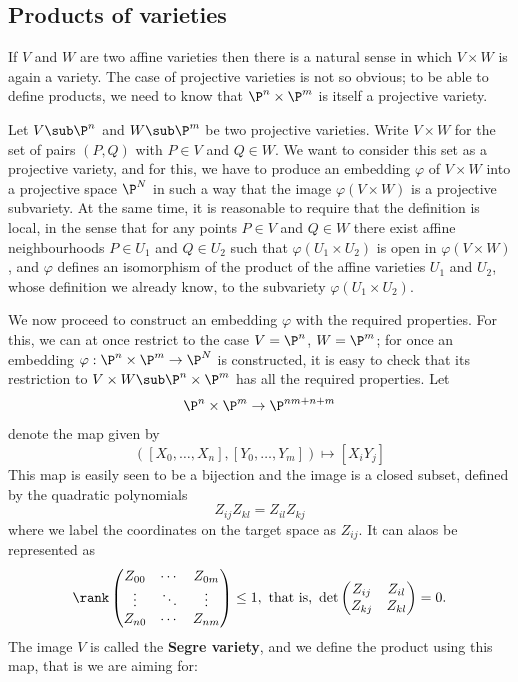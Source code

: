 \subsection{Products of varieties}
If $V$ and $W$ are two affine varieties then there is a natural sense in which $V\times W$ is again a variety. The case of projective varieties is not so obvious; to be able to define products, we need to know that $\P^n\times\P^m$ is itself a projective variety.\par
Let $V\sub\P^n$ and $W\sub\P^m$ be two projective varieties. Write $V\times W$ for the set of pairs $(P,Q)$ with $P\in V$ and $Q\in W$. We want to consider
this set as a projective variety, and for this, we have to produce an embedding $\varphi$ of $V\times W$ into a projective space $\P^N$ in such a way that the image $\varphi(V\times W)$ is a projective subvariety. At the same time, it is reasonable to require that the definition is local, in the sense that for any points $P\in V$ and $Q\in W$ there exist affine neighbourhoods $P\in U_1$ and $Q\in U_2$ such that $\varphi(U_1\times U_2)$ is open in $\varphi(V\times W)$, and $\varphi$ defines an isomorphism of the product of the affine varieties $U_1$ and $U_2$, whose definition we already know, to the subvariety $\varphi(U_1\times U_2)$.\par
We now proceed to construct an embedding $\varphi$ with the required properties. For this, we can at once restrict to the case $V=\P^n$, $W=\P^m$; for once an embedding $\varphi:\P^n\times\P^m\to\P^N$ is constructed, it is easy to check that its restriction to $V\times W\sub\P^n\times\P^m$ has all the required properties. Let 
\[\P^n\times\P^m\to\P^{nm+n+m}\]
denote the map given by
\[([X_0,\dots,X_n],[Y_0,\dots,Y_{m}])\mapsto[X_iY_j]\]
This map is easily seen to be a bijection and the image is a closed subset, defined by the quadratic polynomials
\[Z_{ij}Z_{kl}=Z_{il}Z_{kj}\]
where we label the coordinates on the target space as $Z_{ij}$. It can alaos be represented as
\[\rank\begin{pmatrix}
Z_{00}&\cdots&Z_{0m}\\
\vdots&\ddots&\vdots\\
Z_{n0}&\cdots&Z_{nm}
\end{pmatrix}\leq 1,\text{ that is, }\det\begin{pmatrix}
Z_{ij}&Z_{il}\\
Z_{kj}&Z_{kl}
\end{pmatrix}=0.\]
The image $V$ is called the \textbf{Segre variety}, and we define the product using this map, that is we are aiming for:
